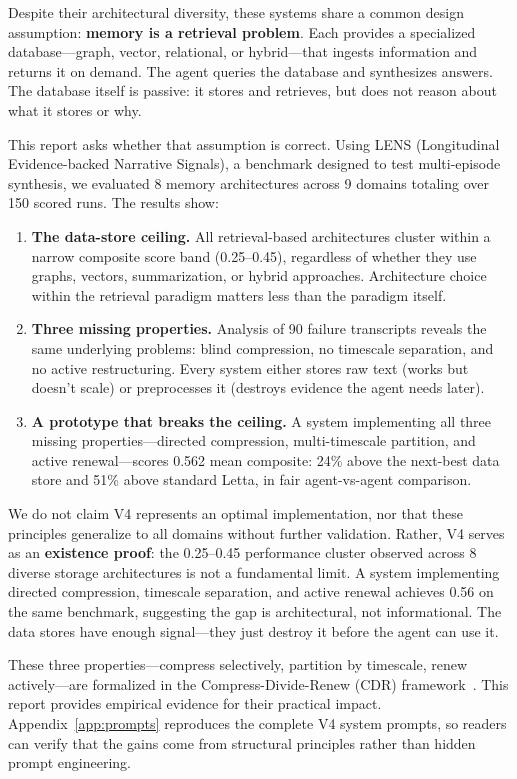 \documentclass[11pt,letterpaper]{article}
\begin{document}
Despite their architectural diversity, these systems share a common design assumption: \textbf{memory is a retrieval problem}. Each provides a specialized database---graph, vector, relational, or hybrid---that ingests information and returns it on demand. The agent queries the database and synthesizes answers. The database itself is passive: it stores and retrieves, but does not reason about what it stores or why.

This report asks whether that assumption is correct. Using LENS (Longitudinal Evidence-backed Narrative Signals), a benchmark designed to test multi-episode synthesis, we evaluated 8 memory architectures across 9 domains totaling over 150 scored runs. The results show:

\begin{enumerate}[nosep]
  \item \textbf{The data-store ceiling.} All retrieval-based architectures cluster within a narrow composite score band (0.25--0.45), regardless of whether they use graphs, vectors, summarization, or hybrid approaches. Architecture choice within the retrieval paradigm matters less than the paradigm itself.
  \item \textbf{Three missing properties.} Analysis of 90 failure transcripts reveals the same underlying problems: blind compression, no timescale separation, and no active restructuring. Every system either stores raw text (works but doesn't scale) or preprocesses it (destroys evidence the agent needs later).
  \item \textbf{A prototype that breaks the ceiling.} A system implementing all three missing properties---directed compression, multi-timescale partition, and active renewal---scores 0.562 mean composite: 24\% above the next-best data store and 51\% above standard Letta, in fair agent-vs-agent comparison.
\end{enumerate}

We do not claim V4 represents an optimal implementation, nor that these principles generalize to all domains without further validation. Rather, V4 serves as an \textbf{existence proof}: the 0.25--0.45 performance cluster observed across 8 diverse storage architectures is not a fundamental limit. A system implementing directed compression, timescale separation, and active renewal achieves 0.56 on the same benchmark, suggesting the gap is architectural, not informational. The data stores have enough signal---they just destroy it before the agent can use it.

These three properties---compress selectively, partition by timescale, renew actively---are formalized in the Compress-Divide-Renew (CDR) framework~\cite{synix2026cdr}. This report provides empirical evidence for their practical impact. Appendix~\ref{app:prompts} reproduces the complete V4 system prompts, so readers can verify that the gains come from structural principles rather than hidden prompt engineering.
\end{document}
